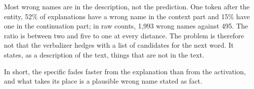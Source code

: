 \begin{table}[t]
\centering
\small
\setlength{\tabcolsep}{5pt}

\caption[Where names sit in the explanation]{Where names sit in the explanation: \% of explanations with a
true or wrong name in the part that describes the context, and in the part that predicts the continuation.
Natural text; 95\% intervals.}
\label{tab:position}
\end{table}

Most wrong names are in the description, not the prediction. One token after the entity, 52\% of
explanations have a wrong name in the context part and 15\% have one in the continuation part; in raw
counts, 1{,}993 wrong names against 495. The ratio is between two and five to one at every distance. The problem is
therefore not that the verbalizer hedges with a list of candidates for the next word. It states, as a
description of the text, things that are not in the text.

In short, the specific fades faster from the explanation than from the activation, and what takes its place
is a plausible wrong name stated as fact.

